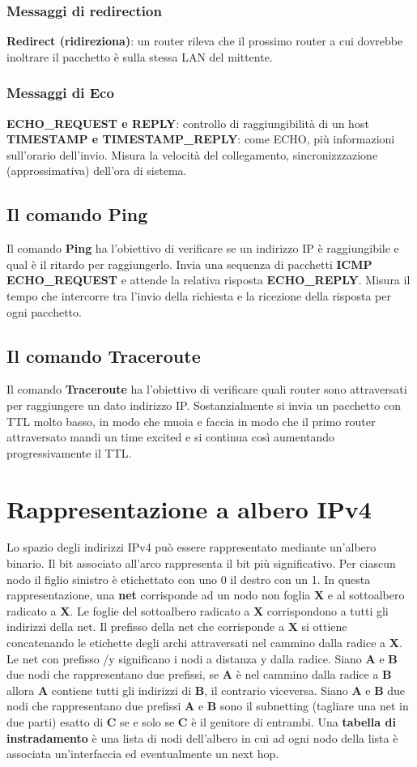 \documentclass{article}
\begin{document}
\subsubsection{Messaggi di redirection}
\textbf{Redirect (ridireziona)}: un router rileva che il prossimo router a cui dovrebbe inoltrare il pacchetto è sulla stessa LAN del mittente.
\subsubsection{Messaggi di Eco}
\textbf{ECHO\_REQUEST e REPLY}: controllo di raggiungibilità di un host\\
\textbf{TIMESTAMP e TIMESTAMP\_REPLY}: come ECHO, più informazioni sull'orario dell'invio. Misura la velocità del collegamento, sincronizzzazione (approssimativa) dell'ora di sistema.
\subsection{Il comando Ping}
Il comando \textbf{Ping} ha l'obiettivo di verificare se un indirizzo IP è raggiungibile e qual è il ritardo per raggiungerlo. Invia una sequenza di pacchetti \textbf{ICMP ECHO\_REQUEST} e attende la relativa risposta \textbf{ECHO\_REPLY}. Misura il tempo che intercorre tra l'invio della richiesta e la ricezione della risposta per ogni pacchetto. 
\subsection{Il comando Traceroute}
Il comando \textbf{Traceroute} ha l'obiettivo di verificare quali router sono attraversati per raggiungere un dato indirizzo IP. Sostanzialmente si invia un pacchetto con TTL molto basso, in modo che muoia e faccia in modo che il primo router attraversato mandi un time excited e si continua così aumentando progressivamente il TTL.
\section{Rappresentazione a albero IPv4}
Lo spazio degli indirizzi IPv4 può essere rappresentato mediante un'albero binario. Il bit associato all'arco rappresenta il bit più significativo. Per ciascun nodo il figlio sinistro è etichettato con uno 0 il destro con un 1. In questa rappresentazione, una \textbf{net} corrisponde ad un nodo non foglia \textbf{X} e al sottoalbero radicato a \textbf{X}. Le foglie del sottoalbero radicato a \textbf{X} corrispondono a tutti gli indirizzi della net. Il prefisso della net che corrisponde a \textbf{X} si ottiene concatenando le etichette degli archi attraversati nel cammino dalla radice a \textbf{X}. Le net con prefisso /y significano i nodi a distanza y dalla radice. Siano \textbf{A} e \textbf{B} due nodi che rappresentano due prefissi, se \textbf{A} è nel cammino dalla radice a \textbf{B} allora \textbf{A} contiene tutti gli indirizzi di \textbf{B}, il contrario viceversa. Siano \textbf{A} e \textbf{B} due nodi che rappresentano due prefissi \textbf{A} e \textbf{B} sono il subnetting (tagliare una net in due parti) esatto di \textbf{C} se e solo se \textbf{C} è il genitore di entrambi. Una \textbf{tabella di instradamento} è una lista di nodi dell'albero in cui ad ogni nodo della lista è associata un'interfaccia ed eventualmente un next hop.
\end{document}
